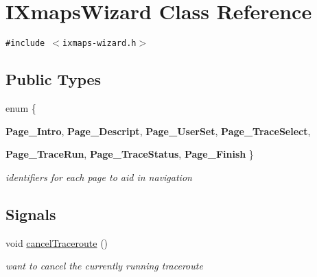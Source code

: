 \hypertarget{classIXmapsWizard}{
\section{IXmapsWizard Class Reference}
\label{classIXmapsWizard}
}
{\tt \#include $<$ixmaps-wizard.h$>$}

\subsection*{Public Types}
\begin{CompactItemize}
\item 
enum \{ \par
\textbf{Page\_\-Intro}, 
\textbf{Page\_\-Descript}, 
\textbf{Page\_\-UserSet}, 
\textbf{Page\_\-TraceSelect}, 
\par
\textbf{Page\_\-TraceRun}, 
\textbf{Page\_\-TraceStatus}, 
\textbf{Page\_\-Finish}
 \}
\begin{CompactList}\small\item\em identifiers for each page to aid in navigation \item\end{CompactList}\end{CompactItemize}
\subsection*{Signals}
\begin{CompactItemize}
\item 
\hypertarget{classIXmapsWizard_4ab3765f3e1cfef1ef5d554d089609e3}{
void \hyperlink{classIXmapsWizard_4ab3765f3e1cfef1ef5d554d089609e3}{cancelTraceroute} ()}
\label{classIXmapsWizard_4ab3765f3e1cfef1ef5d554d089609e3}

\begin{CompactList}\small\item\em want to cancel the currently running traceroute \item\end{CompactList}\end{CompactItemize}
